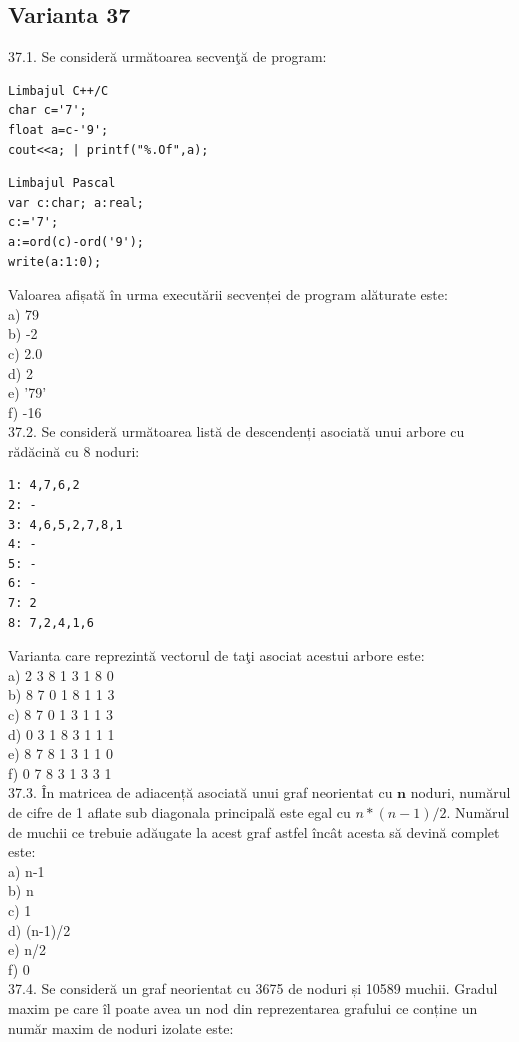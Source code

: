 \begin{itemize}
\begin{enumerate}
\section*{Varianta 37}

37.1. Se consideră următoarea secvenţă de program:
\begin{verbatim}
Limbajul C++/C
char c='7';
float a=c-'9';
cout<<a; | printf("%.Of",a);
\end{verbatim}
\begin{verbatim}
Limbajul Pascal
var c:char; a:real;
c:='7';
a:=ord(c)-ord('9');
write(a:1:0);
\end{verbatim}
Valoarea afișată în urma executării secvenței de program alăturate este:
\\
a) 79
\\
b) -2
\\
c) 2.0
\\
d) 2
\\
e) '79'
\\
f) -16
\\
37.2. Se consideră următoarea listă de descendenți asociată unui arbore cu rădăcină cu 8 noduri:
\begin{verbatim}
1: 4,7,6,2
2: -
3: 4,6,5,2,7,8,1
4: -
5: -
6: -
7: 2
8: 7,2,4,1,6
\end{verbatim}
Varianta care reprezintă vectorul de taţi asociat acestui arbore este:
\\
a) 2 3 8 1 3 1 8 0
\\
b) 8 7 0 1 8 1 1 3
\\
c) 8 7 0 1 3 1 1 3
\\
d) 0 3 1 8 3 1 1 1
\\
e) 8 7 8 1 3 1 1 0
\\
f) 0 7 8 3 1 3 3 1
\\
37.3. În matricea de adiacență asociată unui graf neorientat cu $\mathbf{n}$ noduri, numărul de cifre de 1 aflate sub diagonala principală este egal cu $n*(n-1)/2$. Numărul de muchii ce trebuie adăugate la acest graf astfel încât acesta să devină complet este:
\\
a) n-1
\\
b) n
\\
c) 1
\\
d) (n-1)/2
\\
e) n/2
\\
f) 0
\\
37.4. Se consideră un graf neorientat cu 3675 de noduri și 10589 muchii. Gradul maxim pe care îl poate avea un nod din reprezentarea grafului ce conține un număr maxim de noduri izolate este:

\end{enumerate}
\end{itemize}
